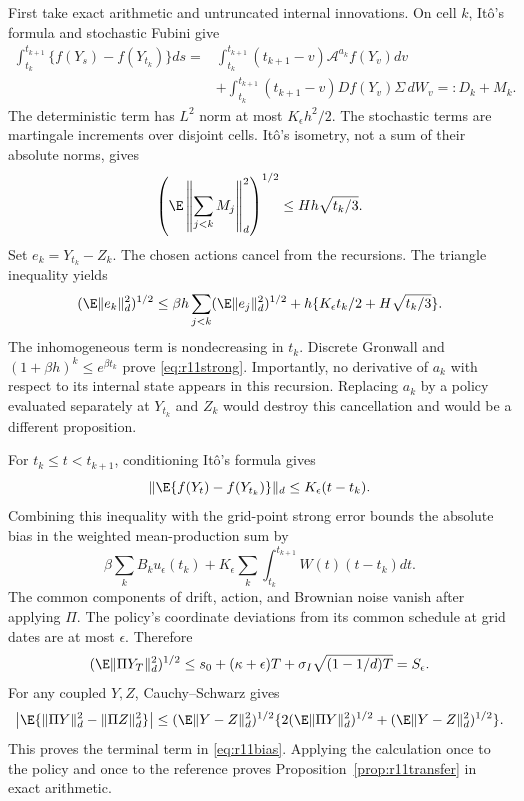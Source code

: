 First take exact arithmetic and untruncated internal innovations. On cell $k$, It\^o's formula and stochastic Fubini give
\begin{align*}
 \int_{t_k}^{t_{k+1}}\{f(Y_s)-f(Y_{t_k})\}ds
 ={}&\int_{t_k}^{t_{k+1}}(t_{k+1}-v)\mathcal A^{a_k} f(Y_v)dv\\
 &+\int_{t_k}^{t_{k+1}}(t_{k+1}-v)D f(Y_v)\Sigma\,dW_v
 =:D_k+M_k.
\end{align*}
The deterministic term has $L^2$ norm at most $K_\epsilon h^2/2$. The stochastic terms are martingale increments over disjoint cells. It\^o's isometry, not a sum of their absolute norms, gives
\[
 \left(\E\left\|\sum_{j<k}M_j\right\|_d^2\right)^{1/2}
 \leq Hh\sqrt{t_k/3}.
\]
Set $e_k=Y_{t_k}-Z_k$. The chosen actions cancel from the recursions. The triangle inequality yields
\[
 (\E\|e_k\|_d^2)^{1/2}
 \leq\beta h\sum_{j<k}(\E\|e_j\|_d^2)^{1/2}
       +h\{K_\epsilon t_k/2+H\sqrt{t_k/3}\}.
\]
The inhomogeneous term is nondecreasing in $t_k$. Discrete Gronwall and $(1+\beta h)^k\leq e^{\beta t_k}$ prove \eqref{eq:r11strong}. Importantly, no derivative of $a_k$ with respect to its internal state appears in this recursion. Replacing $a_k$ by a policy evaluated separately at $Y_{t_k}$ and $Z_k$ would destroy this cancellation and would be a different proposition.

For $t_k\leq t<t_{k+1}$, conditioning It\^o's formula gives
\[
 \|\E\{f(Y_t)-f(Y_{t_k})\}\|_d\leq K_\epsilon(t-t_k).
\]
Combining this inequality with the grid-point strong error bounds the absolute bias in the weighted mean-production sum by
\[
 \beta\sum_k B_k u_\epsilon(t_k)+
 K_\epsilon\sum_k\int_{t_k}^{t_{k+1}}W(t)(t-t_k)dt.
\]
The common components of drift, action, and Brownian noise vanish after applying $\Pi$. The policy's coordinate deviations from its common schedule at grid dates are at most $\epsilon$. Therefore
\[
 (\E\|\Pi Y_T\|_d^2)^{1/2}
 \leq s_0+(\kappa+\epsilon)T+\sigma_I\sqrt{(1-1/d)T}=S_\epsilon.
\]
For any coupled $Y,Z$, Cauchy--Schwarz gives
\[
 \left|\E\{\|\Pi Y\|_d^2-\|\Pi Z\|_d^2\}\right|
 \leq (\E\|Y-Z\|_d^2)^{1/2}
       \{2(\E\|\Pi Y\|_d^2)^{1/2}+(\E\|Y-Z\|_d^2)^{1/2}\}.
\]
This proves the terminal term in \eqref{eq:r11bias}. Applying the calculation once to the policy and once to the reference proves Proposition~\ref{prop:r11transfer} in exact arithmetic.

